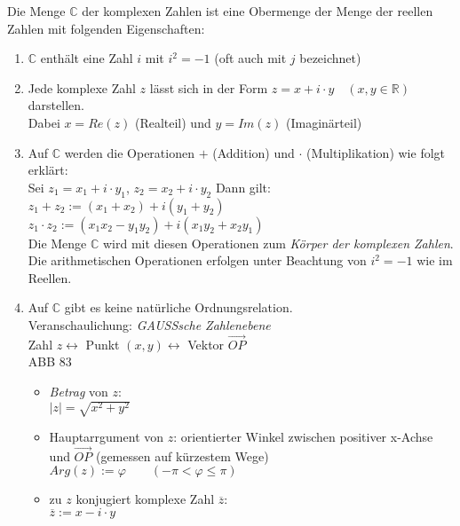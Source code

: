 Die Menge $\mathbb{C}$ der komplexen Zahlen ist eine Obermenge der Menge der reellen Zahlen mit folgenden Eigenschaften:
\begin{enumerate}
\item $\mathbb{C}$ enthält eine Zahl $i$ mit $\boxed{i^2=-1}$ (oft auch mit $j$ bezeichnet)
\item Jede komplexe Zahl $z$ lässt sich in der Form $\boxed{z=x+i\cdot y} \quad (x,y \in \mathbb{R})$ darstellen.\\
Dabei $x=Re(z)$ (Realteil) und $y=Im(z)$ (Imaginärteil)
\item Auf $\mathbb{C}$ werden die Operationen $+$ (Addition) und $\cdot$ (Multiplikation) wie folgt erklärt: \\
Sei $z_1=x_1+i\cdot y_1$, $z_2=x_2+i\cdot y_2$ Dann gilt: \\
$z_1+z_2:= (x_1+x_2)+ i (y_1+y_2)$\\
$z_1\cdot z_2 := (x_1 x_2-y_1 y_2)+i (x_1 y_2 + x_2 y_1)$\\
Die Menge $\mathbb{C}$ wird mit diesen Operationen zum \emph{Körper der komplexen Zahlen}. Die arithmetischen Operationen erfolgen unter Beachtung von $i^2=-1$ wie im Reellen.
\item Auf $\mathbb{C}$ gibt es keine natürliche Ordnungsrelation.\\
Veranschaulichung: \emph{GAUSSsche Zahlenebene}\\
Zahl $z \leftrightarrow$ Punkt $(x,y) \leftrightarrow$ Vektor $\overrightarrow{OP}$\\
ABB 83
\begin{itemize}
\item \emph{Betrag} von $z$: \\
$|z|=\sqrt{x^2+y^2}$
\item Hauptarrgument von $z$: orientierter Winkel zwischen positiver x-Achse und $\overrightarrow{OP}$ (gemessen auf kürzestem Wege)\\
$Arg(z):= \varphi \qquad (-\pi < \varphi \leq \pi )$
\item zu $z$ konjugiert komplexe Zahl $\overline{z}:$\\
$\overline{z} := x - i \cdot y$
\end{itemize}
\end{enumerate}

